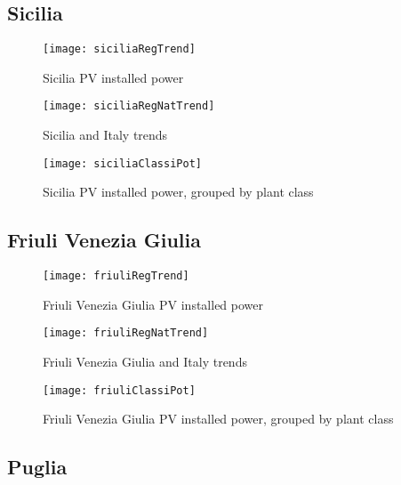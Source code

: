 \documentclass[12pt,a4paper,openright,twoside]{report}
\begin{document}
\clearpage

\subsection*{Sicilia}

\begin{figure}[hp]
	\centering
	\texttt{[image: siciliaRegTrend]}
	\caption{Sicilia PV installed power}
	\label{siciliaRegTrend}
\end{figure}

\begin{figure}[hp]
	\centering
	\texttt{[image: siciliaRegNatTrend]}
	\caption{Sicilia and Italy trends}
	\label{siciliaRegNatTrend}
\end{figure}

\clearpage

\begin{figure}[hp]
	\centering
	\texttt{[image: siciliaClassiPot]}
	\caption{Sicilia PV installed power, grouped by plant class}
	\label{siciliaClassiPot}
\end{figure}



\subsection*{Friuli Venezia Giulia}

\begin{figure}[hp]
	\centering
	\texttt{[image: friuliRegTrend]}
	\caption{Friuli Venezia Giulia PV installed power}
	\label{friuliRegTrend}
\end{figure}

\begin{figure}[hp]
	\centering
	\texttt{[image: friuliRegNatTrend]}
	\caption{Friuli Venezia Giulia and Italy trends}
	\label{friuliRegNatTrend}
\end{figure}

\begin{figure}[hp]
	\centering
	\texttt{[image: friuliClassiPot]}
	\caption{Friuli Venezia Giulia PV installed power, grouped by plant class}
	\label{friuliClassiPot}
\end{figure}

\clearpage

\subsection*{Puglia}
\end{document}

